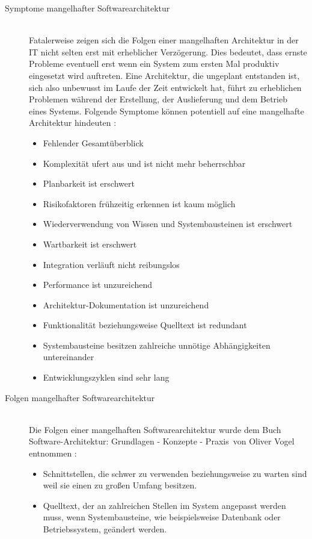 \begin{description}
\item[Symptome mangelhafter Softwarearchitektur] \hfill \\
  Fatalerweise zeigen sich die Folgen einer mangelhaften Architektur in der IT nicht selten erst mit erheblicher Verzögerung. Dies bedeutet, dass ernste Probleme eventuell erst wenn ein System zum ersten Mal produktiv eingesetzt wird auftreten. Eine Architektur, die ungeplant entstanden ist, sich also unbewusst im Laufe der Zeit entwickelt hat, führt zu erheblichen Problemen während der Erstellung, der Auslieferung und dem Betrieb eines Systems. Folgende Symptome können potentiell auf eine mangelhafte Architektur hindeuten \citereset \autocite[siehe][S. 6-8]{Vogel.2009}:
  \begin{itemize}
  \item Fehlender Gesamtüberblick
  \item Komplexität ufert aus und ist nicht mehr beherrschbar
  \item Planbarkeit ist erschwert
  \item Risikofaktoren frühzeitig erkennen ist kaum möglich
  \item Wiederverwendung von Wissen und Systembausteinen ist erschwert
  \item Wartbarkeit ist erschwert
  \item Integration verläuft nicht reibungslos
  \item Performance ist unzureichend
  \item Architektur-Dokumentation ist unzureichend
  \item Funktionalität beziehungsweise Quelltext ist redundant
  \item Systembausteine besitzen zahlreiche unnötige Abhängigkeiten untereinander
  \item Entwicklungszyklen sind sehr lang
  \end{itemize}
\item[Folgen mangelhafter Softwarearchitektur] \hfill \\
  Die Folgen einer mangelhaften Softwarearchitektur wurde dem Buch \glqq Software-Architektur: Grundlagen - Konzepte - Praxis\grqq\ von Oliver Vogel entnommen \citereset \autocite[siehe][6-8]{Vogel.2009}:
  \begin{itemize}
  \item Schnittstellen, die schwer zu verwenden beziehungsweise zu warten sind weil sie einen zu großen Umfang besitzen.
  \item Quelltext, der an zahlreichen Stellen im System angepasst werden muss, wenn Systembausteine, wie beispielsweise Datenbank oder Betriebssystem, geändert werden.

\end{itemize}
\end{description}
